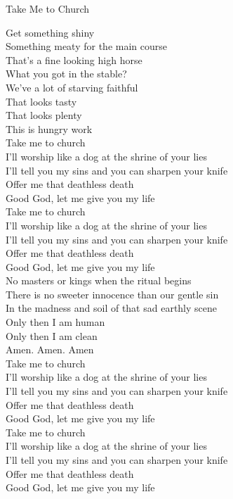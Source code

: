 \documentclass[compress]{beamer}
\begin{document}
\begin{frame}[allowframebreaks]{Take Me to Church}
\begin{center}
Get something shiny \\
Something meaty for the main course \\
That's a fine looking high horse \\
What you got in the stable? \\
We've a lot of starving faithful \\
That looks tasty \\
That looks plenty \\
This is hungry work \\
Take me to church \\
I'll worship like a dog at the shrine of your lies \\
I'll tell you my sins and you can sharpen your knife \\
Offer me that deathless death \\
Good God, let me give you my life \\
Take me to church \\
I'll worship like a dog at the shrine of your lies \\
I'll tell you my sins and you can sharpen your knife \\
Offer me that deathless death \\
Good God, let me give you my life \\
No masters or kings when the ritual begins \\
There is no sweeter innocence than our gentle sin \\
In the madness and soil of that sad earthly scene \\
Only then I am human \\
Only then I am clean \\
Amen. Amen. Amen \\
Take me to church \\
I'll worship like a dog at the shrine of your lies \\
I'll tell you my sins and you can sharpen your knife \\
Offer me that deathless death \\
Good God, let me give you my life \\
Take me to church \\
I'll worship like a dog at the shrine of your lies \\
I'll tell you my sins and you can sharpen your knife \\
Offer me that deathless death \\
Good God, let me give you my life 
\end{center}
\end{frame}
\end{document}
